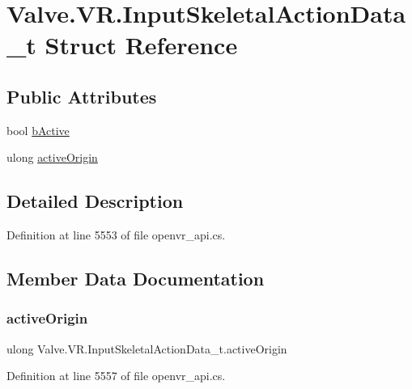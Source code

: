 \hypertarget{struct_valve_1_1_v_r_1_1_input_skeletal_action_data__t}{}\section{Valve.\+V\+R.\+Input\+Skeletal\+Action\+Data\+\_\+t Struct Reference}
\label{struct_valve_1_1_v_r_1_1_input_skeletal_action_data__t}
\subsection*{Public Attributes}
\begin{DoxyCompactItemize}
\item 
bool \mbox{\hyperlink{struct_valve_1_1_v_r_1_1_input_skeletal_action_data__t_a22c1e1108ac7f6d4302638b5cb7996f3}{b\+Active}}
\item 
ulong \mbox{\hyperlink{struct_valve_1_1_v_r_1_1_input_skeletal_action_data__t_a94abf96f2aeeec7714527aa7bcfd1b2c}{active\+Origin}}
\end{DoxyCompactItemize}


\subsection{Detailed Description}


Definition at line 5553 of file openvr\+\_\+api.\+cs.



\subsection{Member Data Documentation}
\mbox{\label{struct_valve_1_1_v_r_1_1_input_skeletal_action_data__t_a94abf96f2aeeec7714527aa7bcfd1b2c}} 
\subsubsection{\texorpdfstring{activeOrigin}{activeOrigin}}
{\footnotesize\ttfamily ulong Valve.\+V\+R.\+Input\+Skeletal\+Action\+Data\+\_\+t.\+active\+Origin}



Definition at line 5557 of file openvr\+\_\+api.\+cs.

